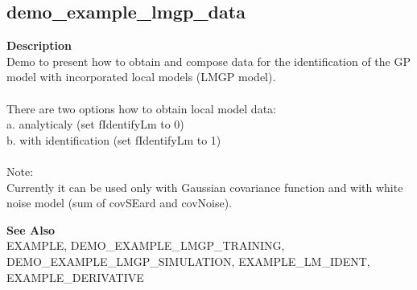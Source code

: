\subsection*{demo\_example\_lmgp\_data}\label{fun:demo_example_lmgp_data}

\textbf{Description}
\\ Demo to present how to obtain and compose data for the identification
 of the GP model with incorporated local models (LMGP model).
\\
\\ There are two options how to obtain local model data:
\\ a. analyticaly (set fIdentifyLm to 0)
\\ b. with identification (set fIdentifyLm to 1)
\\
\\ Note:
\\ Currently it can be used only with Gaussian covariance function and
 with white noise model (sum of covSEard and covNoise).

\textbf{See Also}
\\ EXAMPLE, DEMO\_EXAMPLE\_LMGP\_TRAINING,
\\ DEMO\_EXAMPLE\_LMGP\_SIMULATION,
 EXAMPLE\_LM\_IDENT,
 \\EXAMPLE\_DERIVATIVE
